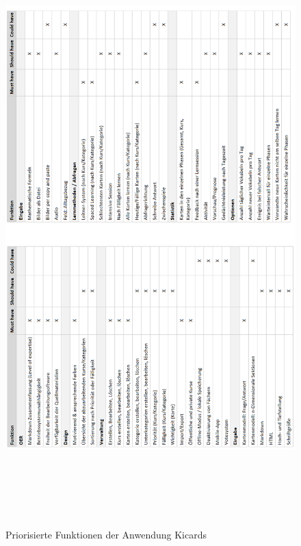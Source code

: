 \begin{figure}[htbp]
\begin{center}
\includegraphics[width = 15cm, height=23cm]{must3.png}
\caption{Priorisierte Funktionen der Anwendung Kicards}
\label{Must-,Should-, Could-Have der Anwendung Kicards}

\end{center}
\end{figure}

